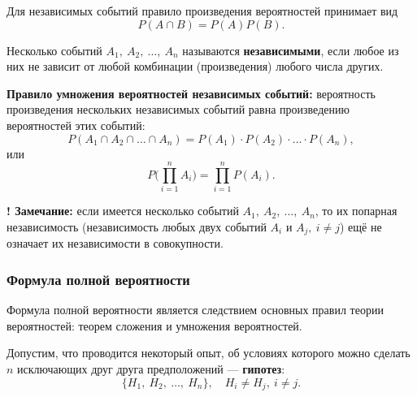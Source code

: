\documentclass[a4paper]{article}
\newcommand{\key}[1]{{\color{Medium}\bfseries #1}}
\newcommand{\note}{{\color{Dark}\bfseries {\Large !} Замечание: \newline}}
\begin{document}
                Для независимых событий правило произведения вероятностей принимает вид
                \begin{equation*}
                    P(A \cap B) = P(A) P(B) .
                \end{equation*}

                Несколько событий $A_1 , \: A_2 , \: \ldots , \: A_n$ называются \key{независимыми}, если любое из них не зависит от любой комбинации (произведения) любого числа других.
                
                \key{Правило умножения вероятностей независимых событий:} \newline
                вероятность произведения нескольких независимых событий равна произведению вероятностей этих событий:
                \begin{equation*}
                    P(A_1 \cap A_2 \cap \ldots \cap A_n) =
                        P(A_1) \cdot P(A_2) \cdot \ldots \cdot P(A_n) ,
                \end{equation*}
                или
                \begin{equation*}
                    P \bigg( \prod\limits_{i = 1}^{n} A_i \bigg) = \prod\limits_{i = 1}^{n} P(A_i) .
                \end{equation*}

                \note
                если имеется несколько событий $A_1 , \: A_2 , \: \ldots , \: A_n$, то их попарная независимость (независимость любых двух событий $A_i \text{ и } A_j , \: i \neq j$) ещё не означает их независимости в совокупности.

            \subsubsection{Формула полной вероятности}

                Формула полной вероятности является следствием основных правил теории вероятностей: теорем сложения и умножения вероятностей.

                Допустим, что проводится некоторый опыт, об условиях которого можно сделать $n$ исключающих друг друга предположений --- \key{гипотез}:
                \begin{equation*}
                    \{ H_1 , \: H_2 , \: \ldots , \: H_n \} , \quad H_i \neq H_j , \: i \neq j .
                \end{equation*}
\end{document}
